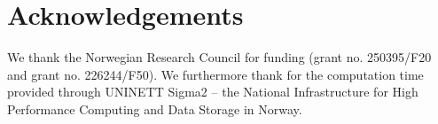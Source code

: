 
\section*{Acknowledgements}

We thank the Norwegian Research Council for funding (grant no. 250395/F20 and grant no. 226244/F50). We furthermore thank for the computation time provided through UNINETT Sigma2 – the National Infrastructure for High Performance Computing and Data Storage in Norway.
